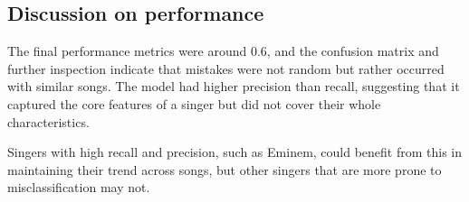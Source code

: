 \documentclass[a4paper,11pt]{article}
\begin{document}
\subsection{Discussion on performance}





The final performance metrics were around 0.6, and the confusion matrix and further inspection indicate that mistakes were not random but rather occurred with similar songs.
The model had higher precision than recall, suggesting that it captured the core features of a singer but did not cover their whole characteristics.

Singers with high recall and precision, such as Eminem, could benefit from this in maintaining their trend across songs,
but other singers that are more prone to misclassification may not. 
\end{document}
